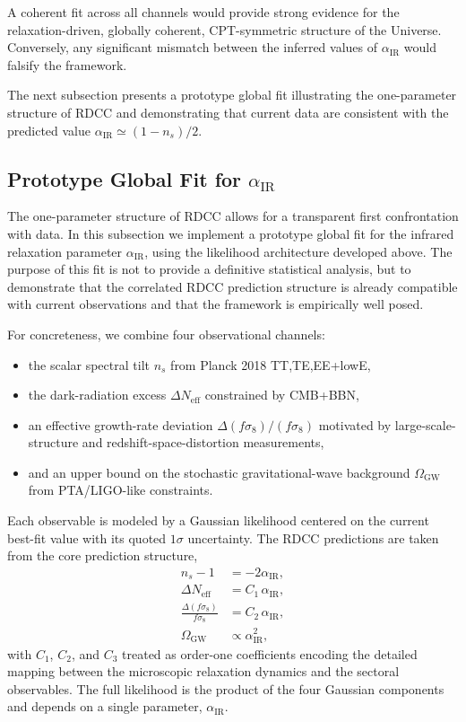 \documentclass[11pt,a4paper]{article}
\begin{document}
A coherent fit across all channels would provide strong evidence for the relaxation-driven,
globally coherent, CPT-symmetric structure of the Universe. Conversely, any significant mismatch
between the inferred values of $\alpha_{\mathrm{IR}}$ would falsify the framework.

The next subsection presents a prototype global fit illustrating the one-parameter structure of
RDCC and demonstrating that current data are consistent with the predicted value
$\alpha_{\mathrm{IR}} \simeq (1 - n_s)/2$.

\subsection{Prototype Global Fit for \texorpdfstring{$\alpha_{\mathrm{IR}}$}{alpha IR}}

The one-parameter structure of RDCC allows for a transparent first confrontation with data.
In this subsection we implement a prototype global fit for the infrared relaxation parameter
$\alpha_{\mathrm{IR}}$, using the likelihood architecture developed above. The purpose of this fit is not
to provide a definitive statistical analysis, but to demonstrate that the correlated RDCC prediction
structure is already compatible with current observations and that the framework is empirically
well posed.

For concreteness, we combine four observational channels:
\begin{itemize}
    \item the scalar spectral tilt $n_s$ from Planck 2018 TT,TE,EE+lowE,
    \item the dark-radiation excess $\Delta N_{\mathrm{eff}}$ constrained by CMB+BBN,
    \item an effective growth-rate deviation $\Delta(f\sigma_8)/(f\sigma_8)$ motivated by
    large-scale-structure and redshift-space-distortion measurements,
    \item and an upper bound on the stochastic gravitational-wave background
    $\Omega_{\mathrm{GW}}$ from PTA/LIGO-like constraints.
\end{itemize}

Each observable is modeled by a Gaussian likelihood centered on the current best-fit value with
its quoted $1\sigma$ uncertainty. The RDCC predictions are taken from the core prediction
structure,
\begin{align}
    n_s - 1 &= -2\alpha_{\mathrm{IR}}, \\
    \Delta N_{\mathrm{eff}} &= C_1\,\alpha_{\mathrm{IR}}, \\
    \frac{\Delta(f\sigma_8)}{f\sigma_8} &= C_2\,\alpha_{\mathrm{IR}}, \\
    \Omega_{\mathrm{GW}} &\propto \alpha_{\mathrm{IR}}^2,
\end{align}
with $C_1$, $C_2$, and $C_3$ treated as order-one coefficients encoding the detailed mapping
between the microscopic relaxation dynamics and the sectoral observables. The full likelihood is
the product of the four Gaussian components and depends on a single parameter,
$\alpha_{\mathrm{IR}}$.
\end{document}
